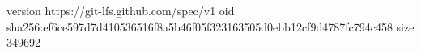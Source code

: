 version https://git-lfs.github.com/spec/v1
oid sha256:ef6ce597d7d410536516f8a5b46f05f323163505d0ebb12cf9d4787fc794c458
size 349692
